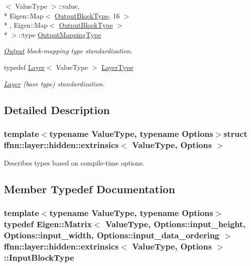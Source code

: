 \begin{DoxyCompactItemize}
$<$ Value\-Type $>$\-::value, \\*
Eigen\-::\-Map$<$ \hyperlink{structffnn_1_1layer_1_1hidden_1_1extrinsics_ac5ca721e2e5843ddcf90351b59c4e56e}{Output\-Block\-Type}, 16 $>$\\*
, Eigen\-::\-Map$<$ \hyperlink{structffnn_1_1layer_1_1hidden_1_1extrinsics_ac5ca721e2e5843ddcf90351b59c4e56e}{Output\-Block\-Type} $>$\\*
 $>$\-::type \hyperlink{structffnn_1_1layer_1_1hidden_1_1extrinsics_a886b2e28314f8641f14407a84af8132c}{Output\-Mapping\-Type}
\begin{DoxyCompactList}\small\item\em \hyperlink{classffnn_1_1layer_1_1_output}{Output} block-\/mapping type standardization. \end{DoxyCompactList}\item 
typedef \hyperlink{classffnn_1_1layer_1_1_layer}{Layer}$<$ Value\-Type $>$ \hyperlink{structffnn_1_1layer_1_1hidden_1_1extrinsics_a06f383c22ed682751b9a4cb8855da9eb}{Layer\-Type}
\begin{DoxyCompactList}\small\item\em \hyperlink{classffnn_1_1layer_1_1_layer}{Layer} (base type) standardization. \end{DoxyCompactList}\end{DoxyCompactItemize}


\subsection{Detailed Description}
\subsubsection*{template$<$typename Value\-Type, typename Options$>$struct ffnn\-::layer\-::hidden\-::extrinsics$<$ Value\-Type, Options $>$}

Describes types based on compile-\/time options. 

\subsection{Member Typedef Documentation}
\hypertarget{structffnn_1_1layer_1_1hidden_1_1extrinsics_af5299a48a27726ba0d407ecb28890092}{
\subsubsection[{Input\-Block\-Type}]{\setlength{\rightskip}{0pt plus 5cm}template$<$typename Value\-Type, typename Options$>$ typedef Eigen\-::\-Matrix$<$ Value\-Type, Options\-::input\-\_\-height, Options\-::input\-\_\-width, Options\-::input\-\_\-data\-\_\-ordering $>$ {\bf ffnn\-::layer\-::hidden\-::extrinsics}$<$ Value\-Type, Options $>$\-::{\bf Input\-Block\-Type}}}\label{structffnn_1_1layer_1_1hidden_1_1extrinsics_af5299a48a27726ba0d407ecb28890092}



